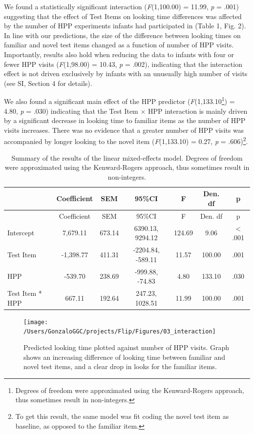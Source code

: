 \documentclass[english,man]{apa6}
\begin{document}
We found a statistically significant interaction (\emph{F}(1,100.00) = 11.99, \emph{p} = .001) suggesting that the effect of Test Items on looking time differences was affected by the number of HPP experiments infants had participated in (Table 1, Fig. 2). In line with our predictions, the size of the difference between looking times on familiar and novel test items changed as a function of number of HPP visits. Importantly, results also hold when reducing the data to infants with four or fewer HPP visits (\emph{F}(1,98.00) = 10.43, \emph{p} = .002), indicating that the interaction effect is not driven exclusively by infants with an unusually high number of visits (see SI, Section 4 for details).

We also found a significant main effect of the HPP predictor (\emph{F}(1,133.10\footnote{Degrees of freedom were approximated using the Kenward-Rogers approach, thus sometimes result in non-integers.}) = 4.80, \emph{p} = .030) indicating that the Test Item \(\times\) HPP interaction is mainly driven by a significant decrease in looking time to familiar items as the number of HPP visits increases. There was no evidence that a greater number of HPP visits was accompanied by longer looking to the novel item (\emph{F}(1,133.10) = 0.27, \emph{p} = .606)\footnote{To get this result, the same model was fit coding the novel test item as baseline, as opposed to the familiar item.}.

\begin{longtable}[]{@{}lcccccc@{}}
\caption{\label{tab:unnamed-chunk-2}Summary of the results of the linear mixed-effects model. Degrees of freedom were approximated using the Kenward-Rogers approach, thus sometimes result in non-integers.}\tabularnewline
\toprule
& Coefficient & SEM & 95\%CI & F & Den. df & p\tabularnewline
\midrule
\endfirsthead
\toprule
& Coefficient & SEM & 95\%CI & F & Den. df & p\tabularnewline
\midrule
\endhead
Intercept & 7,679.11 & 673.14 & 6390.13, 9294.12 & 124.69 & 9.06 & \textless{} .001\tabularnewline
Test Item & -1,398.77 & 411.31 & -2204.84, -589.11 & 11.57 & 100.00 & .001\tabularnewline
HPP & -539.70 & 238.69 & -999.88, -74.83 & 4.80 & 133.10 & .030\tabularnewline
Test Item * HPP & 667.11 & 192.64 & 247.23, 1028.51 & 11.99 & 100.00 & .001\tabularnewline
\bottomrule
\end{longtable}

\begin{figure}
\texttt{[image: /Users/GonzaloGGC/projects/Flip/Figures/03\_interaction]} \caption{Predicted looking time plotted against number of HPP visits. Graph shows an increasing difference of looking time between familiar and novel test items, and a clear drop in looks for the familiar items.}\label{fig:unnamed-chunk-3}
\end{figure}
\end{document}

